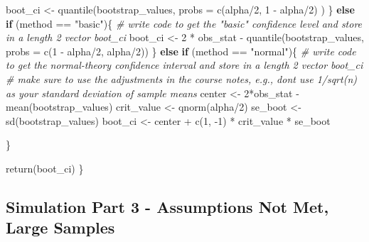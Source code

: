\documentclass[
]{article}
\newenvironment{Shaded}{\begin{snugshade}}{\end{snugshade}}
\newcommand{\AttributeTok}[1]{\textcolor[rgb]{0.77,0.63,0.00}{#1}}
\newcommand{\CommentTok}[1]{\textcolor[rgb]{0.56,0.35,0.01}{\textit{#1}}}
\newcommand{\ControlFlowTok}[1]{\textcolor[rgb]{0.13,0.29,0.53}{\textbf{#1}}}
\newcommand{\DecValTok}[1]{\textcolor[rgb]{0.00,0.00,0.81}{#1}}
\newcommand{\FunctionTok}[1]{\textcolor[rgb]{0.00,0.00,0.00}{#1}}
\newcommand{\NormalTok}[1]{#1}
\newcommand{\OtherTok}[1]{\textcolor[rgb]{0.56,0.35,0.01}{#1}}
\newcommand{\SpecialCharTok}[1]{\textcolor[rgb]{0.00,0.00,0.00}{#1}}
\newcommand{\StringTok}[1]{\textcolor[rgb]{0.31,0.60,0.02}{#1}}
\begin{document}
\begin{Shaded}
\begin{Highlighting}[]
\NormalTok{    boot\_ci }\OtherTok{\textless{}{-}} \FunctionTok{quantile}\NormalTok{(bootstrap\_values, }
                        \AttributeTok{probs =} \FunctionTok{c}\NormalTok{(alpha}\SpecialCharTok{/}\DecValTok{2}\NormalTok{, }\DecValTok{1} \SpecialCharTok{{-}}\NormalTok{ alpha}\SpecialCharTok{/}\DecValTok{2}\NormalTok{)}
\NormalTok{                        )}
\NormalTok{  \} }\ControlFlowTok{else} \ControlFlowTok{if}\NormalTok{ (method }\SpecialCharTok{==} \StringTok{"basic"}\NormalTok{)\{}
    \CommentTok{\# write code to get the "basic" confidence level and store in a length 2 vector boot\_ci}
\NormalTok{    boot\_ci }\OtherTok{\textless{}{-}} \DecValTok{2} \SpecialCharTok{*}\NormalTok{ obs\_stat }\SpecialCharTok{{-}} 
      \FunctionTok{quantile}\NormalTok{(bootstrap\_values, }\AttributeTok{probs =} \FunctionTok{c}\NormalTok{(}\DecValTok{1} \SpecialCharTok{{-}}\NormalTok{ alpha}\SpecialCharTok{/}\DecValTok{2}\NormalTok{, alpha}\SpecialCharTok{/}\DecValTok{2}\NormalTok{))}
\NormalTok{  \} }\ControlFlowTok{else} \ControlFlowTok{if}\NormalTok{ (method }\SpecialCharTok{==} \StringTok{"normal"}\NormalTok{)\{}
    \CommentTok{\# write code to get the normal{-}theory confidence interval and store in a length 2 vector boot\_ci}
    \CommentTok{\# make sure to use the adjustments in the course notes, e.g., don\textquotesingle{}t use 1/sqrt(n) as your standard deviation of sample means}
\NormalTok{    center }\OtherTok{\textless{}{-}} \DecValTok{2}\SpecialCharTok{*}\NormalTok{obs\_stat }\SpecialCharTok{{-}} \FunctionTok{mean}\NormalTok{(bootstrap\_values)}
\NormalTok{    crit\_value }\OtherTok{\textless{}{-}} \FunctionTok{qnorm}\NormalTok{(alpha}\SpecialCharTok{/}\DecValTok{2}\NormalTok{)}
\NormalTok{    se\_boot }\OtherTok{\textless{}{-}} \FunctionTok{sd}\NormalTok{(bootstrap\_values)}
\NormalTok{    boot\_ci }\OtherTok{\textless{}{-}}\NormalTok{ center }\SpecialCharTok{+} \FunctionTok{c}\NormalTok{(}\DecValTok{1}\NormalTok{, }\SpecialCharTok{{-}}\DecValTok{1}\NormalTok{) }\SpecialCharTok{*}\NormalTok{ crit\_value }\SpecialCharTok{*}\NormalTok{ se\_boot}
      
\NormalTok{  \}}
  
  \FunctionTok{return}\NormalTok{(boot\_ci)}
\NormalTok{\}}
\end{Highlighting}
\end{Shaded}

\hypertarget{simulation-part-3---assumptions-not-met-large-samples}{%
\subsection{Simulation Part 3 - Assumptions Not Met, Large
Samples}\label{simulation-part-3---assumptions-not-met-large-samples}}
\end{document}
